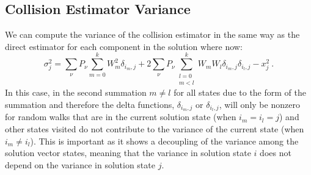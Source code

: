 \subsection{Collision Estimator Variance}
\label{subsec:forward_variance}
We can compute the variance of the collision estimator in the same way
as the direct estimator for each component in the solution where now:
\begin{equation}
  \sigma_j^2 = \sum_{\nu} P_{\nu} \sum_{m=0}^k W_{m}^2 \delta_{i_m,j} + 2
  \sum_{\nu} P_{\nu} \sum_{\substack{ l=0 \\ m<l}}^k W_m W_l
  \delta_{i_m,j} \delta_{i_l,j} - x_j^2\:.
  \label{eq:collision_variance_1}
\end{equation}
In this case, in the second summation $m \neq l$ for all states due to
the form of the summation and therefore the delta functions,
$\delta_{i_m,j}$ or $\delta_{i_l,j}$, will only be nonzero for random
walks that are in the current solution state (when $i_m = i_l = j$)
and other states visited do not contribute to the variance of the
current state (when $i_m \neq i_l$). This is important as it shows a
decoupling of the variance among the solution vector states, meaning
that the variance in solution state $i$ does not depend on the
variance in solution state $j$.


